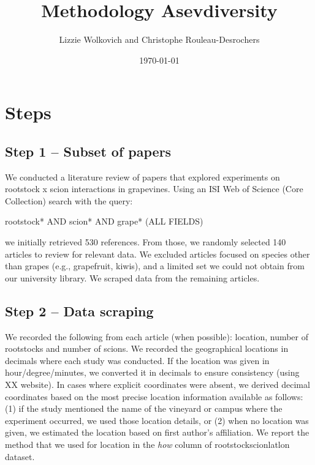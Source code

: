 \documentclass[11pt, oneside]{article}   	%
\title{Methodology Asevdiversity}
\author{Lizzie Wolkovich and Christophe Rouleau-Desrochers}
\date{\today}
\begin{document}
\maketitle
\section{Steps}
\subsection{Step 1 – Subset of papers}
We conducted a literature review of papers that explored experiments on rootstock x scion interactions in grapevines. Using an ISI Web of Science (Core Collection) search with the query:

rootstock* AND scion* AND grape* (ALL FIELDS)

we initially retrieved 530 references. From those, we randomly selected 140 articles to review for relevant data. We excluded articles focused on species other than grapes (e.g., grapefruit, kiwis), and a limited set we could not obtain from our university library. We scraped data from the remaining articles.

\subsection{Step 2 – Data scraping}

We recorded the following from each article (when possible): location, number of rootstocks and number of scions. We recorded the geographical locations in decimals where each study was conducted. If the location was given in hour/degree/minutes, we converted it in decimals to ensure consistency (using XX website). In cases where explicit coordinates were absent, we derived decimal coordinates based on the most precise location information available as follows: (1) if the study mentioned the name of the vineyard or campus where the experiment occurred, we used those location details, or (2) when no location was given, we estimated the location based on first author’s affiliation. We report the method that we used for location in the \emph{how} column of rootstockscionlatlon dataset. %
\end{document}
